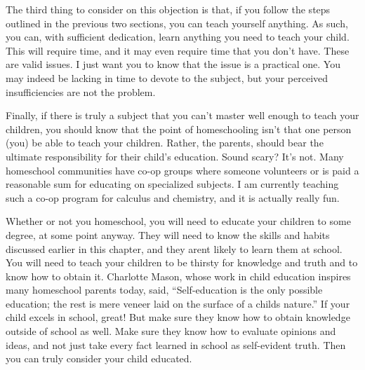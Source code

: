 \documentclass[letterpaper]{article}
\begin{document}
{\color{black}
The third thing to consider on this objection is that, if you follow the
steps outlined in the previous two sections, you can teach yourself
anything. As such, you can, with sufficient dedication, learn anything
you need to teach your child. This will require time, and it may even
require time that you don’t have. These are valid issues. I just want
you to know that the issue is a practical one. 
\textcolor[rgb]{0.32941177,0.5529412,0.83137256}{You may indeed be
lacking in time to devote to the subject, but your perceived
insufficiencies are not the problem. }}

{\color{black}
Finally, if there is truly a subject that you can’t master well enough
to teach your children, you should know that the point of homeschooling
isn’t that one person (you) be able to teach your children.
\textcolor[rgb]{0.32941177,0.5529412,0.83137256}{Rather, the parents},
should bear the ultimate responsibility for their child’s education.
\textcolor[rgb]{0.32941177,0.5529412,0.83137256}{Sound scary? It’s not.
}Many homeschool communities have co-op groups where someone volunteers
or is paid a reasonable sum for educating on specialized subjects. I am
currently teaching such a co-op program for calculus and chemistry, and
it is actually really fun.}

{\color{black}
Whether or not you homeschool, you will need to educate your children
\textcolor[rgb]{0.32941177,0.5529412,0.83137256}{to some degree, at
some point }anyway.  They will need to know the skills and habits
discussed earlier in this chapter, and they aren{\textquotesingle}t
likely to learn them at school. You will need to teach your children to
be thirsty for knowledge and truth and to know how to obtain it.
Charlotte Mason, whose work in child education inspires many homeschool
parents today, said, “Self-education is the only possible education;
the rest is mere veneer laid on the surface of a
child{\textquotesingle}s nature.”  If
\textcolor[rgb]{0.32941177,0.5529412,0.83137256}{your child} excels in
school, great!  But make sure they know how to obtain knowledge outside
of school \textcolor[rgb]{0.32941177,0.5529412,0.83137256}{as
}\textcolor[rgb]{0.32941177,0.5529412,0.83137256}{well}. Make sure they
know how to evaluate opinions and ideas, and not just take every fact
learned in school as self-evident truth. Then you can truly consider
\textcolor[rgb]{0.32941177,0.5529412,0.83137256}{your child} educated.}
\end{document}
